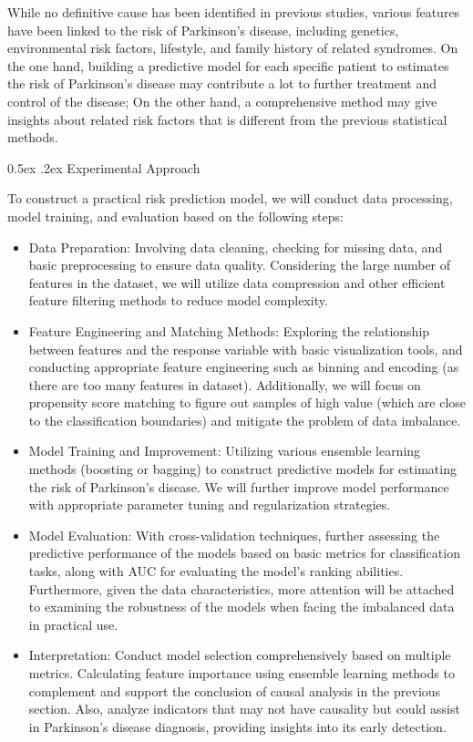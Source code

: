 \documentclass[12pt,]{article}
\makeatletter
\renewcommand\subsubsection{
  \@startsection{subsubsection}{3}{\z@}
    {-1.0ex\@plus -1ex \@minus -.2ex}%
    {0.5ex \@plus .2ex}%
    {\normalfont\normalsize\bf}} %
\makeatother
\begin{document}
While no definitive cause has been identified in previous studies,
various features have been linked to the risk of Parkinson's disease,
including genetics, environmental risk factors, lifestyle, and family
history of related syndromes. On the one hand, building a predictive
model for each specific patient to estimates the risk of Parkinson's
disease may contribute a lot to further treatment and control of the
disease; On the other hand, a comprehensive method may give insights
about related risk factors that is different from the previous
statistical methods.

\hypertarget{experimental-approach-1}{%
\subsubsection{Experimental Approach}\label{experimental-approach-1}}

To construct a practical risk prediction model, we will conduct data
processing, model training, and evaluation based on the following steps:

\begin{itemize}
\item
  Data Preparation: Involving data cleaning, checking for missing data,
  and basic preprocessing to ensure data quality. Considering the large
  number of features in the dataset, we will utilize data compression
  and other efficient feature filtering methods to reduce model
  complexity.
\item
  Feature Engineering and Matching Methods: Exploring the relationship
  between features and the response variable with basic visualization
  tools, and conducting appropriate feature engineering such as binning
  and encoding (as there are too many features in dataset).
  Additionally, we will focus on propensity score matching to figure out
  samples of high value (which are close to the classification
  boundaries) and mitigate the problem of data imbalance.
\item
  Model Training and Improvement: Utilizing various ensemble learning
  methods (boosting or bagging) to construct predictive models for
  estimating the risk of Parkinson's disease. We will further improve
  model performance with appropriate parameter tuning and regularization
  strategies.
\item
  Model Evaluation: With cross-validation techniques, further assessing
  the predictive performance of the models based on basic metrics for
  classification tasks, along with AUC for evaluating the model's
  ranking abilities. Furthermore, given the data characteristics, more
  attention will be attached to examining the robustness of the models
  when facing the imbalanced data in practical use.
\item
  Interpretation: Conduct model selection comprehensively based on
  multiple metrics. Calculating feature importance using ensemble
  learning methods to complement and support the conclusion of causal
  analysis in the previous section. Also, analyze indicators that may
  not have causality but could assist in Parkinson's disease diagnosis,
  providing insights into its early detection.
\end{itemize}
\end{document}
